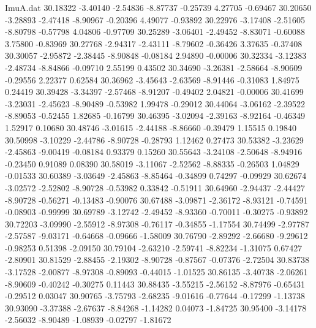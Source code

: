 \begin{filecontents}{ImuA.dat}
  30.18322   -3.40140   -2.54836   -8.87737   -0.25739    4.27705   -0.69467
  30.20650   -3.28893   -2.47418   -8.90967   -0.20396    4.49077   -0.93892
  30.22976   -3.17408   -2.51605   -8.80798   -0.57798    4.04806   -0.97709
  30.25289   -3.06401   -2.49452   -8.83071   -0.60088    3.75800   -0.83969
  30.27768   -2.94317   -2.43111   -8.79602   -0.36426    3.37635   -0.37408
  30.30057   -2.95872   -2.38445   -8.90848   -0.08184    2.94890   -0.00006
  30.32334   -3.12383   -2.48734   -8.84866   -0.09710    2.55199    0.43502
  30.34690   -3.26381   -2.58664   -8.90609   -0.29556    2.22377    0.62584
  30.36962   -3.45643   -2.63569   -8.91446   -0.31083    1.84975    0.24419
  30.39428   -3.34397   -2.57468   -8.91207   -0.49402    2.04821   -0.00006
  30.41699   -3.23031   -2.45623   -8.90489   -0.53982    1.99478   -0.29012
  30.44064   -3.06162   -2.39522   -8.89053   -0.52455    1.82685   -0.16799
  30.46395   -3.02094   -2.39163   -8.92164   -0.46349    1.52917    0.10680
  30.48746   -3.01615   -2.44188   -8.86660   -0.39479    1.15515    0.19840
  30.50998   -3.10229   -2.44786   -8.90728   -0.28793    1.12462    0.27473
  30.53382   -3.23629   -2.45863   -9.00419   -0.08184    0.93379    0.15260
  30.55643   -3.24108   -2.50648   -8.94916   -0.23450    0.91089    0.08390
  30.58019   -3.11067   -2.52562   -8.88335   -0.26503    1.04829   -0.01533
  30.60389   -3.03649   -2.45863   -8.85464   -0.34899    0.74297   -0.09929
  30.62674   -3.02572   -2.52802   -8.90728   -0.53982    0.33842   -0.51911
  30.64960   -2.94437   -2.44427   -8.90728   -0.56271   -0.13483   -0.90076
  30.67488   -3.09871   -2.36172   -8.93121   -0.74591   -0.08903   -0.99999
  30.69789   -3.12742   -2.49452   -8.93360   -0.70011   -0.30275   -0.93892
  30.72203   -3.09990   -2.55912   -8.97308   -0.76117   -0.34855   -1.17554
  30.74499   -2.97787   -2.57587   -9.03171   -0.64668   -0.09666   -1.58009
  30.76790   -2.89292   -2.66680   -9.29612   -0.98253    0.51398   -2.09150
  30.79104   -2.63210   -2.59741   -8.82234   -1.31075    0.67427   -2.80901
  30.81529   -2.88455   -2.19302   -8.90728   -0.87567   -0.07376   -2.72504
  30.83738   -3.17528   -2.00877   -8.97308   -0.89093   -0.44015   -1.01525
  30.86135   -3.40738   -2.06261   -8.90609   -0.40242   -0.30275    0.11443
  30.88435   -3.55215   -2.56152   -8.87976   -0.65431   -0.29512    0.03047
  30.90765   -3.75793   -2.68235   -9.01616   -0.77644   -0.17299   -1.13738
  30.93090   -3.37388   -2.67637   -8.84268   -1.14282    0.04073   -1.84725
  30.95400   -3.14178   -2.56032   -8.90489   -1.08939   -0.02797   -1.81672

\end{filecontents}
